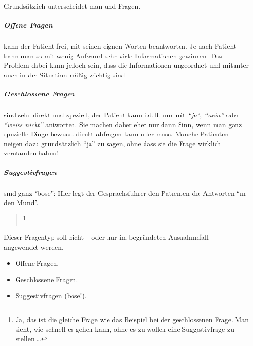 {
Grundsätzlich unterscheidet man  und  Fragen. 

\subparagraph{Offene Fragen} kann der Patient frei, mit seinen eignen Worten
beantworten. Je nach Patient kann man so mit wenig Aufwand sehr viele
Informationen gewinnen. Das Problem dabei kann jedoch sein, dass die
Informationen ungeordnet und mitunter auch in der Situation mäßig wichtig sind. 

\begin{quote}
  
\end{quote}

\subparagraph{Geschlossene Fragen} sind sehr direkt und speziell, der Patient
kann i.d.R. nur mit \emph{"`ja"'}, \emph{"`nein"'} oder \emph{"`weiss nicht"'} antworten.
Sie machen daher eher nur dann Sinn, wenn man ganz spezielle Dinge bewusst
direkt abfragen kann oder muss.  Manche Patienten neigen dazu
grundsätzlich "`ja"' zu sagen, ohne dass sie die Frage wirklich verstanden
haben!

\begin{quote}
  
\end{quote}

\subparagraph{Suggestivfragen} sind ganz "`böse"': Hier
legt der Gesprächsführer den Patienten die Antworten "`in den Mund"'. 

\begin{quote}
  
  \footnote{Ja, das ist die gleiche Frage wie
  das Beispiel bei der geschlossenen Frage. Man sieht, wie schnell es gehen kann,
  ohne es zu wollen eine Suggestivfrage zu stellen \ldots}
\end{quote}

Dieser Fragentyp
soll nicht -- oder nur im begründeten Ausnahmefall -- angewendet werden. 

}
{
\begin{itemize}
    \item Offene Fragen.
    \item Geschlossene Fragen.
    \item Suggestivfragen (böse!).
\end{itemize}
}

